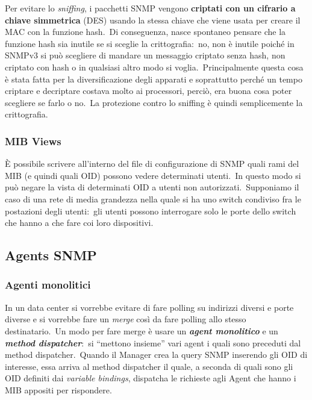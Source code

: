 Per evitare lo \textit{sniffing}, i pacchetti SNMP vengono \textbf{criptati con un cifrario a chiave simmetrica} (DES) usando la stessa chiave che viene usata per creare il MAC con la funzione hash.\
Di conseguenza, nasce spontaneo pensare che la funzione hash sia inutile se si sceglie la crittografia:\ no, non è inutile poiché in SNMPv3 si può scegliere di mandare un messaggio criptato senza hash, non criptato con hash o in qualsiasi altro modo si voglia.\
Principalmente questa cosa è stata fatta per la diversificazione degli apparati e soprattutto perché un tempo criptare e decriptare costava molto ai processori, perciò, era buona cosa poter scegliere se farlo o no.\
La protezione contro lo sniffing è quindi semplicemente la crittografia.

\subsubsection{MIB Views}

È possibile scrivere all'interno del file di configurazione di SNMP quali rami del MIB (e quindi quali OID) possono vedere determinati utenti.\
In questo modo si può negare la vista di determinati OID a utenti non autorizzati.\
Supponiamo il caso di una rete di media grandezza nella quale si ha uno switch condiviso fra le postazioni degli utenti:\ gli utenti possono interrogare solo le porte dello switch che hanno a che fare coi loro dispositivi.

\subsection{Agents SNMP}

\subsubsection{Agenti monolitici}

In un data center si vorrebbe evitare di fare polling su indirizzi diversi e porte diverse e si vorrebbe fare un \textit{merge} così da fare polling allo stesso destinatario.\
Un modo per fare merge è usare un \textbf{\textit{agent monolitico}} e un \textbf{\textit{method dispatcher}}:\ si ``mettono insieme'' vari agent i quali sono preceduti dal method dispatcher.\
Quando il Manager crea la query SNMP inserendo gli OID di interesse, essa arriva al method dispatcher il quale, a seconda di quali sono gli OID definiti dai \textit{variable bindings}, dispatcha le richieste agli Agent che hanno i MIB appositi per rispondere.\

